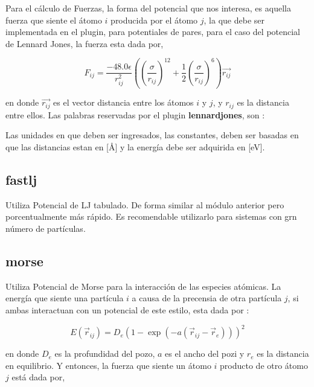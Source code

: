 Para el c\'alculo de Fuerzas, la forma del potencial que nos interesa, es aquella fuerza que siente el \'atomo $i$ producida por el \'atomo $j$, la que debe ser implementada en el plugin, para potentiales de pares, para el caso del potencial de Lennard Jones, la fuerza esta dada por,

$$F_{ij} = \frac{-48.0\epsilon}{r_{ij}^2}\left( \left(\frac{\sigma}{r_{ij}}\right)^{12} + \frac{1}{2}\left(\frac{\sigma}{r_{ij}}\right)^6 \right) \vec{r_{ij}}$$

en donde $\vec{r_{ij}}$ es el vector distancia entre los \'atomos $i$ y $j$, y $r_{ij}$ es la distancia entre ellos. 
Las palabras reservadas por el plugin \textbf{lennardjones}, son :


Las unidades en que deben ser ingresados, las constantes, deben ser basadas en que las distancias estan en [\AA] y la energ\'ia debe ser adquirida en [eV].


\subsection{fastlj}
Utiliza Potencial de LJ tabulado. De forma similar al m\'odulo anterior pero porcentualmente m\'as r\'apido. Es recomendable utilizarlo para sistemas con grn n\'umero de part\'iculas.

\subsection{morse}
Utiliza Potencial de Morse para la interacci\'on de las especies at\'omicas. La energ\'ia que siente una part\'icula $i$ a causa de la precensia de otra part\'icula $j$, si ambas interactuan con un potencial de este estilo, esta dada por :

$$E(\vec{r}_{ij}) = D_e\left(1-\exp(-a(\vec{r}_{ij}-\vec{r}_e))\right)^2$$

en donde $D_e$ es la profundidad del pozo, $a$ es el ancho del pozi y $r_e$ es la distancia en equilibrio. Y entonces, la fuerza que siente un \'atomo $i$ producto de otro \'atomo $j$ est\'a dada por,

